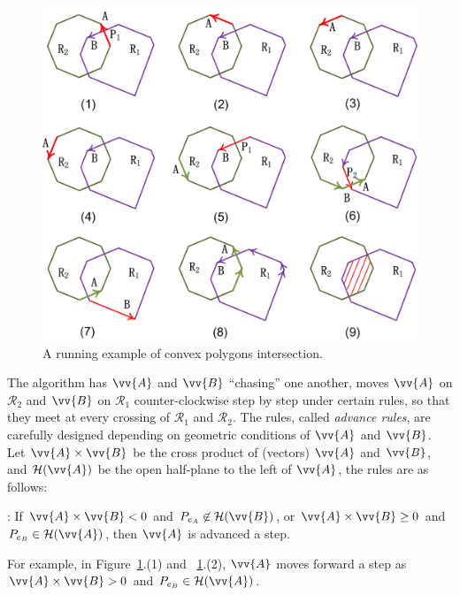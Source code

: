 \begin{figure}[tb!]
	\centering
	\includegraphics[scale=0.8]{figures/Fig-convex-poly-inter.png}
	\caption{\small A running example of convex polygons intersection.}
	\vspace{-1ex}
	\label{fig:c-poly-inter}
\end{figure}

The algorithm has $\vv{A}$ and $\vv{B}$ ``chasing'' one another, \ie moves $\vv{A}$ on $\mathcal{R}_2$ and $\vv{B}$ on $\mathcal{R}_1$ counter-clockwise step by step under certain rules, so that they meet at every crossing of $\mathcal{R}_1$ and $\mathcal{R}_2$.
%
The rules, called \emph{advance rules}, are carefully designed depending on geometric conditions of $\vv{A}$ and $\vv{B}$.
Let $\vv{A} \times \vv{B}$ be the cross product of (vectors) $\vv{A}$ and $\vv{B}$, and $\mathcal{H}(\vv{A})$ be the open half-plane to the left of $\vv{A}$, the rules are as follows:

: If $\vv{A} \times \vv{B} < 0$ and $P_{e_A} \not \in \mathcal{H}(\vv{B})$, or $\vv{A} \times \vv{B} \ge 0$ and $P_{e_B} \in \mathcal{H}(\vv{A})$, then $\vv{A}$ is advanced a step.

For example, in Figure~\ref{fig:c-poly-inter}.(1) and ~\ref{fig:c-poly-inter}.(2), $\vv{A}$ moves forward a step as  $\vv{A} \times \vv{B} > 0$ and $P_{e_B} \in \mathcal{H}(\vv{A})$.

